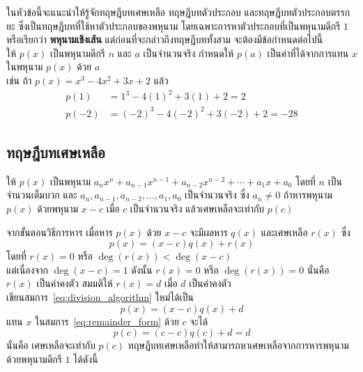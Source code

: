 ในหัวข้อนี้จะแนะนำให้รู้จักทฤษฎีบทเศษเหลือ ทฤษฎีบทตัวประกอบ และทฤษฎีบทตัวประกอบตรรกยะ ซึ่งเป็นทฤษฎีบทที่ใช้หาตัวประกอบของพหุนาม โดยเฉพาะการหาตัวประกอบที่เป็นพหุนามดีกรี $1$ หรือเรียกว่า \textbf{พหุนามเชิงเส้น} แต่ก่อนที่จะกล่าวถึงทฤษฎีบททั้งสาม จะต้องมีข้อกำหนดต่อไปนี้
\\[0.5em]
ให้ $p(x)$ เป็นพหุนามดีกรี $n$ และ $a$ เป็นจำนวนจริง กำหนดให้ $p(a)$ เป็นค่าที่ได้จากการแทน $x$ ในพหุนาม $p(x)$ ด้วย $a$
\\[0.5em]
เช่น ถ้า $p(x) = x^3 - 4x^2 + 3x + 2$ แล้ว
\begin{align*}
	p(1) &= 1^3 - 4(1)^2 + 3(1) + 2 = 2 \\
	p(-2) &= (-2)^3 - 4(-2)^2 + 3(-2) + 2 = -28
\end{align*}

\newpage
\subsection*{ทฤษฎีบทเศษเหลือ}
\begin{theorembox}
	ให้ $p(x)$ เป็นพหุนาม $a_n x^n + a_{n-1} x^{n-1} + a_{n-2} x^{n-2} + \cdots + a_1 x + a_0$ โดยที่ $n$ เป็นจำนวนเต็มบวก และ $a_n, a_{n-1}, a_{n-2}, \ldots, a_1, a_0$ เป็นจำนวนจริง ซึ่ง $a_n \neq 0$ ถ้าหารพหุนาม $p(x)$ ด้วยพหุนาม $x-c$ เมื่อ $c$ เป็นจำนวนจริง แล้วเศษเหลือจะเท่ากับ $p(c)$
\end{theorembox}
\proof จากขั้นตอนวิธีการหาร เมื่อหาร $p(x)$ ด้วย $x-c$ จะมีผลหาร $q(x)$ และเศษเหลือ $r(x)$ ซึ่ง
\begin{equation}
	p(x) = (x-c)q(x) + r(x) \label{eq:division_algorithm}
\end{equation}
โดยที่ $r(x) = 0$ หรือ $\operatorname{deg}(r(x)) < \operatorname{deg}(x-c)$
\\[0.5em]
แต่เนื่องจาก $\operatorname{deg}(x-c) = 1$ ดังนั้น $r(x) = 0$ หรือ $\operatorname{deg}(r(x)) = 0$ นั่นคือ $r(x)$ เป็นค่าคงตัว สมมติให้ $r(x) = d$ เมื่อ $d$ เป็นค่าคงตัว
\\[0.5em]
เขียนสมการ~\eqref{eq:division_algorithm} ใหม่ได้เป็น
\begin{equation}
	p(x) = (x-c)q(x) + d \label{eq:remainder_form}
\end{equation}
แทน $x$ ในสมการ~\eqref{eq:remainder_form} ด้วย $c$ จะได้
\begin{equation*}
	p(c) = (c-c)q(c) + d = d
\end{equation*}
นั่นคือ เศษเหลือจะเท่ากับ $p(c)$
\newpage
ทฤษฎีบทเศษเหลือทำให้สามารถหาเศษเหลือจากการหารพหุนามด้วยพหุนามดีกรี $1$ ได้ดังนี้

